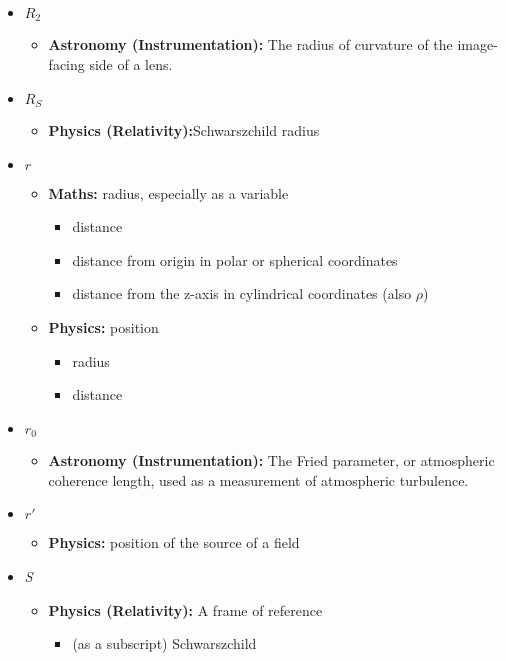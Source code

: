 \begin{itemize}
				\item $R_2$
				\begin{itemize}
					\item\textbf{Astronomy (Instrumentation):} The radius of curvature of the image-facing side of a lens.
				\end{itemize}
				
				\item $R_S$
				\begin{itemize}
					\item \textbf{Physics (Relativity):}Schwarszchild radius
				\end{itemize}
				
				\item $r$
				\begin{itemize}
					\item\textbf{Maths:} radius, especially as a variable
					\begin{itemize}
						\item distance
						\item distance from origin in polar or spherical coordinates
						\item distance from the z-axis in cylindrical coordinates (also $\rho$)
					\end{itemize}
					\item\textbf{Physics:} position
					\begin{itemize}
						\item radius
						\item distance 
					\end{itemize}
				\end{itemize}
				
				\item$r_0$
				\begin{itemize}
					\item \textbf{Astronomy (Instrumentation):} The Fried parameter, or atmospheric coherence length, used as a measurement of atmospheric turbulence. 
				\end{itemize}
								
				\item$r'$
				\begin{itemize}
					\item \textbf{Physics:} position of the source of a field
				\end{itemize}
				
				\item \textit{S}
				\begin{itemize}
					\item\textbf{Physics (Relativity):} A frame of reference
					\begin{itemize}
						\item (as a subscript) Schwarszchild
					\end{itemize}
				\end{itemize}
				

\end{itemize}
